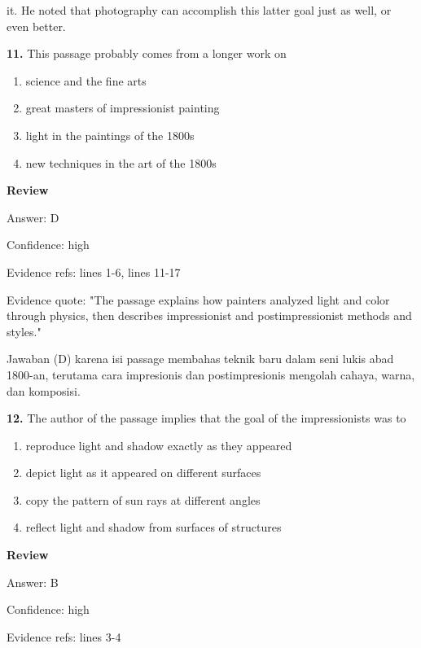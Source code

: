 \documentclass[12pt]{article}
\begin{document}
it. He noted that photography can accomplish this latter goal just as well, or even better.\par
\endgroup
\medskip
\noindent\textbf{11.} This passage probably comes from a longer work on
\begin{enumerate}[label=(\Alph*),leftmargin=*,itemsep=0.2em]
\item science and the fine arts
\item great masters of impressionist painting
\item light in the paintings of the 1800s
\item new techniques in the art of the 1800s
\end{enumerate}
\par
\begingroup
\setlength{\parskip}{0pt}
\setlength{\parindent}{0pt}
\textbf{Review}\par
Answer: D\par
Confidence: high\par
Evidence refs: lines 1-6, lines 11-17\par
Evidence quote: "The passage explains how painters analyzed light and color through physics, then describes impressionist and postimpressionist methods and styles."\par
Jawaban (D) karena isi passage membahas teknik baru dalam seni lukis abad 1800-an, terutama cara impresionis dan postimpresionis mengolah cahaya, warna, dan komposisi.\par
\endgroup
\par
\vspace{0.25\baselineskip}
\noindent\textbf{12.} The author of the passage implies that the goal of the impressionists was to
\begin{enumerate}[label=(\Alph*),leftmargin=*,itemsep=0.2em]
\item reproduce light and shadow exactly as they appeared
\item depict light as it appeared on different surfaces
\item copy the pattern of sun rays at different angles
\item reflect light and shadow from surfaces of structures
\end{enumerate}
\par
\begingroup
\setlength{\parskip}{0pt}
\setlength{\parindent}{0pt}
\textbf{Review}\par
Answer: B\par
Confidence: high\par
Evidence refs: lines 3-4\par
\end{document}
